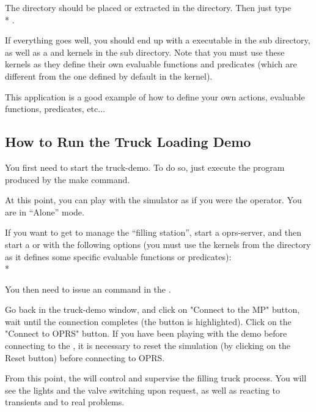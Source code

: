 The  directory should be placed or extracted in the 
directory. Then just type \\*
.

If everything goes well, you should end up with a  executable
in the  sub directory, as well as a  and
 kernels in the  sub directory. Note that
you must use these kernels as they define their own evaluable functions and
predicates (which are different from the one defined by default in the kernel).

This application is a good example of how to define your own actions, evaluable
functions, predicates, etc...

\subsection{How to Run the Truck Loading Demo}

You first need to start the truck-demo. To do so, just execute the
 program produced by the make command.

At this point, you can play with the simulator as if you were the operator. You
are in ``Alone'' mode.

If you want to get \COPRS{} to manage the ``filling station'', start a oprs-server,
and then start a \CPK{} or \XPK{} with the following options (you must use the
kernels from the  directory as it defines some
specific evaluable functions or predicates): \\*

You then need to issue an  command in the \OPRSS{}.

Go back in the truck-demo window, and click on "Connect to the MP" button, wait
until the connection completes (the button is highlighted). Click on the
"Connect to OPRS" button. If you have been playing with the demo before
connecting to the \CPK{}, it is necessary to reset the simulation (by clicking
on the Reset button) before connecting to OPRS.

From this point, the \CPK{} will control and supervise the filling truck
process. You will see the lights and the valve switching upon \OPRS{} request,
as well as \OPRS{} reacting to transients and to real problems.

